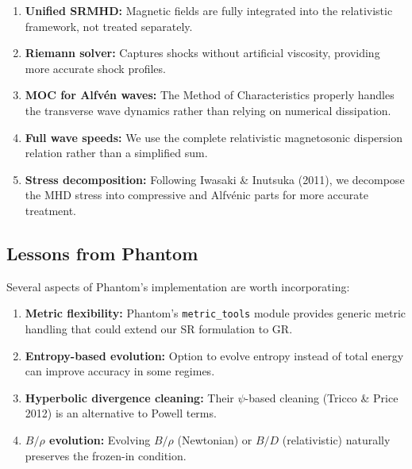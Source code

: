 \documentclass[12pt,a4paper]{article}
\begin{document}
\begin{enumerate}
    \item \textbf{Unified SRMHD:} Magnetic fields are fully integrated into the
        relativistic framework, not treated separately.

    \item \textbf{Riemann solver:} Captures shocks without artificial viscosity,
        providing more accurate shock profiles.

    \item \textbf{MOC for Alfv\'en waves:} The Method of Characteristics properly
        handles the transverse wave dynamics rather than relying on numerical
        dissipation.

    \item \textbf{Full wave speeds:} We use the complete relativistic magnetosonic
        dispersion relation rather than a simplified sum.

    \item \textbf{Stress decomposition:} Following Iwasaki \& Inutsuka (2011),
        we decompose the MHD stress into compressive and Alfv\'enic parts for
        more accurate treatment.
\end{enumerate}

\subsection{Lessons from Phantom}

Several aspects of Phantom's implementation are worth incorporating:

\begin{enumerate}
    \item \textbf{Metric flexibility:} Phantom's \texttt{metric\_tools} module
        provides generic metric handling that could extend our SR formulation to GR.

    \item \textbf{Entropy-based evolution:} Option to evolve entropy instead of
        total energy can improve accuracy in some regimes.

    \item \textbf{Hyperbolic divergence cleaning:} Their $\psi$-based cleaning
        (Tricco \& Price 2012) is an alternative to Powell terms.

    \item \textbf{$B/\rho$ evolution:} Evolving $B/\rho$ (Newtonian) or $B/D$
        (relativistic) naturally preserves the frozen-in condition.
\end{enumerate}
\end{document}
